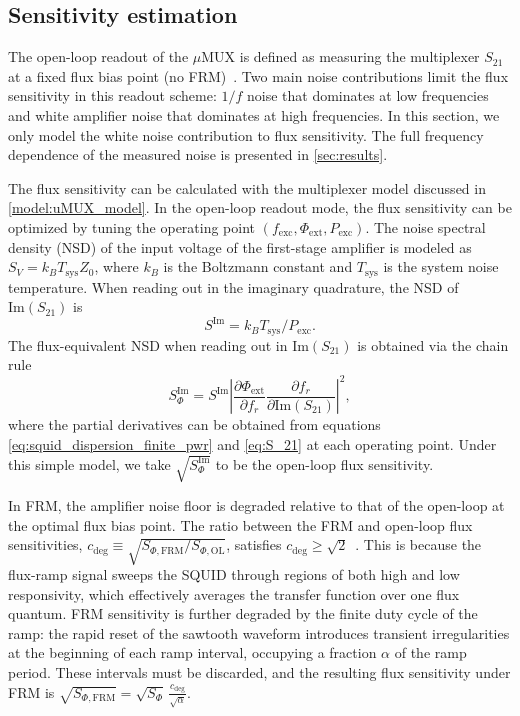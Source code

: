 \documentclass[
 prd,
 reprint,
 superscriptaddress,
 amsmath,amssymb,
 aps,
 floatfix,
]{revtex4-2}
\newcommand{\uMUX}{$\mu$MUX\xspace}
\begin{document}
\subsection{Sensitivity estimation} \label{model:sensitivity}

The open-loop readout of the \uMUX is defined as measuring the multiplexer $S_{21}$ at a fixed flux bias point (no FRM)~\cite{schuster_simulation_2023, redondo_optimal_2024}. Two main noise contributions limit the flux sensitivity in this readout scheme: $1/f$ noise that dominates at low frequencies and white amplifier noise that dominates at high frequencies. In this section, we only model the white noise contribution to flux sensitivity. The full frequency dependence of the measured noise is presented in \cref{sec:results}.

The flux sensitivity can be calculated with the multiplexer model discussed in \cref{model:uMUX_model}. In the open-loop readout mode, the flux sensitivity can be optimized by tuning the operating point $(f_{\mathrm{exc}}, \Phi_{\mathrm{ext}}, P_{\mathrm{exc}})$. The noise spectral density (NSD) of the input voltage of the first-stage amplifier is modeled as $S_V = k_B T_{\text{sys}} Z_0$, where $k_B$ is the Boltzmann constant and $T_{\mathrm{sys}}$ is the system noise temperature. When reading out in the imaginary quadrature, the NSD of $\mathrm{Im}(S_{21})$ is
\begin{equation} \label{eq:S_im}
    S^{\mathrm{Im}} = k_B T_{\text{sys}} / P_{\mathrm{exc}}.
\end{equation}
The flux-equivalent NSD when reading out in $\mathrm{Im}(S_{21})$ is obtained via the chain rule
\begin{equation} \label{eq:OL_noise_model}
    S^\text{Im}_\Phi = S^{\text{Im}} \left|\frac{\partial \Phi_{\text{ext}}}{\partial f_r}  \frac{\partial f_r}{\partial \text{Im}(S_{21})} \right|^2,
\end{equation}
where the partial derivatives can be obtained from equations \eqref{eq:squid_dispersion_finite_pwr} and \eqref{eq:S_21} at each operating point. Under this simple model, we take $\sqrt{S^\text{Im}_\Phi}$ to be the open-loop flux sensitivity.

In FRM, the amplifier noise floor is degraded relative to that of the open-loop at the optimal flux bias point. The ratio between the FRM and open-loop flux sensitivities, $c_{\mathrm{deg}}\equiv \sqrt{S_{\Phi,\mathrm{FRM}}/S_{\Phi, \text{OL}}}$, satisfies $c_{\mathrm{deg}} \geq \sqrt{2}$~\cite{mates_flux-ramp_2012}. This is because the flux-ramp signal sweeps the SQUID through regions of both high and low responsivity, which effectively averages the transfer function over one flux quantum. FRM sensitivity is further degraded by the finite duty cycle of the ramp: the rapid reset of the sawtooth waveform introduces transient irregularities at the beginning of each ramp interval, occupying a fraction $\alpha$ of the ramp period. These intervals must be discarded, and the resulting flux sensitivity under FRM is $\sqrt{S_{\Phi,\mathrm{FRM}}} = \sqrt{S_{\Phi}}\,\frac{c_{\mathrm{deg}}}{\sqrt{\alpha}}$.
\end{document}
